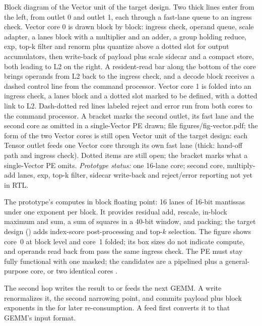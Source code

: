 %
  {Block diagram of the Vector unit of the target design. Two thick lines enter from the left, from outlet 0 and outlet 1, each through a fast-lane queue to an ingress check. Vector core 0 is drawn block by block: ingress check, operand queue, scale adapter, a lanes block with a multiplier and an adder, a group holding reduce, exp, top-k filter and renorm plus quantize above a dotted slot for output accumulators, then write-back of payload plus scale sidecar and a compact store, both leading to L2 on the right. A resident-read bar along the bottom of the core brings operands from L2 back to the ingress check, and a decode block receives a dashed control line from the command processor. Vector core 1 is folded into an ingress check, a lanes block and a dotted slot marked to be defined, with a dotted link to L2. Dash-dotted red lines labeled reject and error run from both cores to the command processor. A bracket marks the second outlet, its fast lane and the second core as omitted in a single-Vector PE}%
  {drawn; file figures/fig-vector.pdf; the form of the two Vector cores is still open}%
  {Vector unit of the target design: each Tensor outlet feeds one Vector core through its own fast lane (thick: hand-off path and ingress check). Dotted items are still open; the bracket marks what a single-Vector PE omits. \textit{Prototype status:} one 16-lane core; second core, multiply-add lanes, exp, top-k filter, sidecar write-back and reject/error reporting not yet in RTL.}

%
The prototype's \VectorCore computes in block floating point: 16 lanes of 16-bit mantissas under one exponent per block.
It provides residual add, rescale, in-block maximum and sum, a sum of squares in a 40-bit window, and packing; the target design () adds index-score post-processing and top-$k$ selection.
The figure shows core~0 at block level and core~1 folded; its box sizes do not indicate compute, and operands read back from \Lii pass the same ingress check.
The PE must stay fully functional with one \VectorCore masked; the candidates are a pipelined plus a general-purpose core, or two identical cores
.

%
The second hop writes the result to \Lii or feeds the next GEMM.
A write renormalizes it, the second narrowing point, and commits payload plus block exponents in the \sidecar for later re-consumption.
A feed first converts it to that GEMM's input format.

